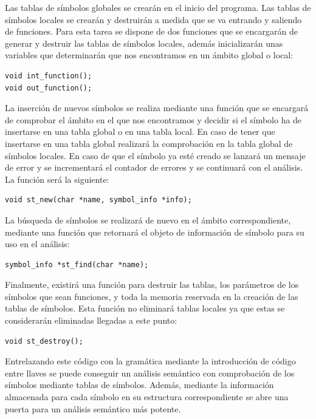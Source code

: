 \documentclass[a4paper,10pt]{article}
\begin{document}
Las tablas de símbolos globales se crearán en el inicio del programa. Las tablas de símbolos locales se crearán y destruirán a medida que se va entrando y saliendo de funciones. Para esta tarea se dispone de dos funciones que se encargarán de generar y destruir las tablas de símbolos locales, además inicializarán unas variables que determinarán que nos encontramos en un ámbito global o local:

\begin{lstlisting}
void int_function();
void out_function();
\end{lstlisting}

La inserción de nuevos símbolos se realiza mediante una función que se encargará de comprobar el ámbito en el que nos encontramos y decidir si el símbolo ha de insertarse en una tabla global o en una tabla local. En caso de tener que insertarse en una tabla global realizará la comprobación en la tabla global de símbolos locales. En caso de que el símbolo ya esté creado se lanzará un mensaje de error y se incrementará el contador de errores y se continuará con el análisis. La función será la siguiente:

\begin{lstlisting}
void st_new(char *name, symbol_info *info);
\end{lstlisting}

La búsqueda de símbolos se realizará de nuevo en el ámbito correspondiente, mediante una función que retornará el objeto de información de símbolo para su uso en el análisis:

\begin{lstlisting}
symbol_info *st_find(char *name);
\end{lstlisting}

Finalmente, existirá una función para destruir las tablas, los parámetros de los símbolos que sean funciones, y toda la memoria reservada en la creación de las tablas de símbolos. Esta función no eliminará tablas locales ya que estas se considerarán eliminadas llegadas a este punto:

\begin{lstlisting}
void st_destroy();
\end{lstlisting}

Entrelazando este código con la gramática mediante la introducción de código entre llaves se puede conseguir un análisis semántico con comprobación de los símbolos mediante tablas de símbolos. Además, mediante la información almacenada para cada símbolo en su estructura correspondiente se abre una puerta para un análisis semántico más potente.
\end{document}
